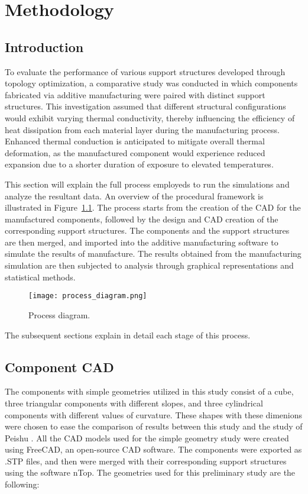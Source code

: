 \documentclass[../main.tex]{subfiles}
\begin{document}
	
\chapter{Methodology}
\section{Introduction}

To evaluate the performance of various support structures developed through topology optimization, a comparative study was conducted in which components fabricated via additive manufacturing were paired with distinct support structures. This investigation assumed that different structural configurations would exhibit varying thermal conductivity, thereby influencing the efficiency of heat dissipation from each material layer during the manufacturing process. Enhanced thermal conduction is anticipated to mitigate overall thermal deformation, as the manufactured component would experience reduced expansion due to a shorter duration of exposure to elevated temperatures.

This section will explain the full process employeds to run the simulations and analyze the resultant data. An overview of the procedural framework is illustrated in Figure~\ref{fig:process_diagram}. The process starts from the creation of the CAD for the manufactured components, followed by the design and CAD creation of the corresponding support structures. The components and the support structures are then merged, and imported into the additive manufacturing software to simulate the results of manufacture. The results obtained from the manufacturing simulation are then subjected to analysis through graphical representations and statistical methods.

\begin{figure}
  \begin{center}
    \texttt{[image: process\_diagram.png]}
  \end{center}
  \caption{Process diagram.}\label{fig:process_diagram}
\end{figure}

The subsequent sections explain in detail each stage of this process.

\section{Component CAD}

The components with simple geometries utilized in this study consist of a cube, three triangular
components with different slopes, and three cylindrical components with different values of
curvature. These shapes with these dimenions were chosen to ease the comparison of results between this study and the study of Peishu \cite{chungpei-hsuStudyLatticeSupport2024}. All the CAD models
used for the simple geometry study were created using FreeCAD, an open-source CAD software. The components were exported as .STP files, and then were merged with their corresponding support structures using the software nTop. The geometries used for this preliminary study are the following:
\end{document}
